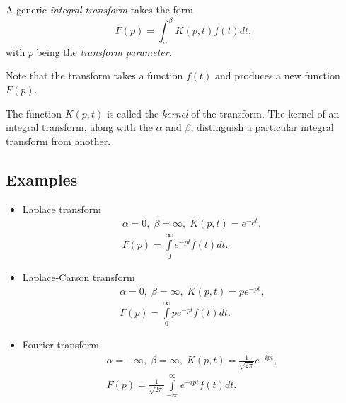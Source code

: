\documentclass[12pt]{article}
\begin{document}

A generic \emph{integral transform} takes the form $$F(p)  =  \int_\alpha^\beta K(p, t) f(t)dt,$$ with $p$ being the {\em transform parameter}.

Note that the transform takes a function $f(t)$ and produces a new function $F(p)$.

The function $K(p, t)$ is called the \emph{kernel} of the transform.  The kernel of an integral transform, along with the  $\alpha$ and $\beta$, distinguish a particular integral transform from another.  

\subsection*{Examples}
\begin{itemize}
\item Laplace transform
\begin{gather*}
\alpha = 0,\; \beta = \infty,\; K(p,t) = e^{-pt},\\
F(p) = \int\limits_0^\infty e^{-pt} f(t) dt.
\end{gather*}

\item Laplace-Carson transform
\begin{gather*}
\alpha = 0,\; \beta = \infty,\; K(p,t) = pe^{-pt},\\
F(p) = \int\limits_0^\infty pe^{-pt} f(t) dt.
\end{gather*}

\item Fourier transform
\begin{gather*}
\alpha = -\infty,\; \beta = \infty,\; K(p,t) = \frac{1}{\sqrt{2\pi}}e^{-ipt},\\
F(p) = \frac{1}{\sqrt{2\pi}}
	\int\limits_{-\infty}^\infty e^{-ipt} f(t) dt.
\end{gather*}
\end{itemize}
\end{document}
